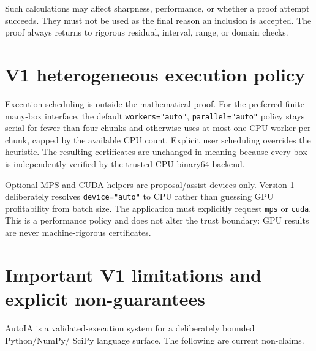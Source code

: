 \documentclass[11pt]{article}
\begin{document}
Such calculations may affect sharpness, performance, or whether a proof attempt
succeeds.  They must not be used as the final reason an inclusion is accepted.
The proof always returns to rigorous residual, interval, range, or domain checks.

\section{V1 heterogeneous execution policy}

Execution scheduling is outside the mathematical proof.  For the preferred finite many-box interface, the default \texttt{workers="auto"}, \texttt{parallel="auto"} policy stays serial for fewer than four chunks and otherwise uses at most one CPU worker per chunk, capped by the available CPU count.  Explicit user scheduling overrides the heuristic.  The resulting certificates are unchanged in meaning because every box is independently verified by the trusted CPU binary64 backend.

Optional MPS and CUDA helpers are proposal/assist devices only.  Version 1 deliberately resolves \texttt{device="auto"} to CPU rather than guessing GPU profitability from batch size.  The application must explicitly request \texttt{mps} or \texttt{cuda}.  This is a performance policy and does not alter the trust boundary: GPU results are never machine-rigorous certificates.

\section{Important V1 limitations and explicit non-guarantees}

AutoIA is a validated-execution system for a deliberately bounded Python/NumPy/
SciPy language surface.  The following are current non-claims.
\end{document}
